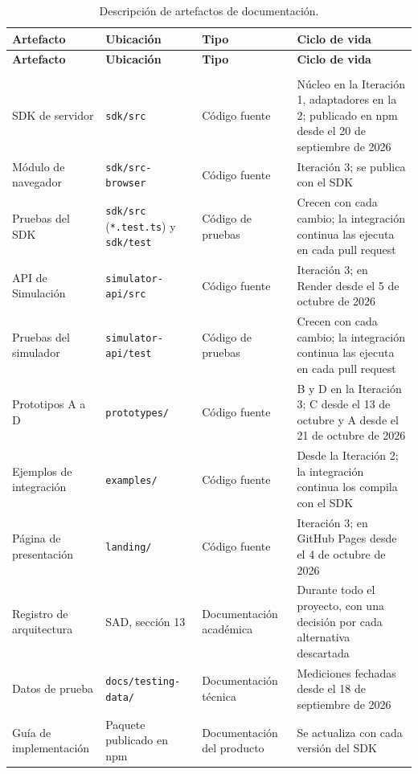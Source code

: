 \begin{center}
\renewcommand{\arraystretch}{1.2}
\begin{longtable}{|P{0.243}|P{0.241}|P{0.241}|P{0.241}|}
  \hline
  \textbf{Artefacto} & \textbf{Ubicación} & \textbf{Tipo} & \textbf{Ciclo de vida} \\
  \hline
  \endfirsthead
  \hline
  \textbf{Artefacto} & \textbf{Ubicación} & \textbf{Tipo} & \textbf{Ciclo de vida} \\
  \hline
  \endhead
  \caption{Descripción de artefactos de documentación.}
  \label{tab:artefactos-documentacion}\\
  \endlastfoot
  SDK de servidor & \texttt{sdk/src} & Código fuente & Núcleo en la Iteración 1, adaptadores en la 2; publicado en npm desde el 20 de septiembre de 2026 \\
  \hline
  Módulo de navegador & \texttt{sdk/src-browser} & Código fuente & Iteración 3; se publica con el SDK \\
  \hline
  Pruebas del SDK & \texttt{sdk/src} (\texttt{*.test.ts}) y \texttt{sdk/test} & Código de pruebas & Crecen con cada cambio; la integración continua las ejecuta en cada pull request \\
  \hline
  API de Simulación & \texttt{simulator-api/src} & Código fuente & Iteración 3; en Render desde el 5 de octubre de 2026 \\
  \hline
  Pruebas del simulador & \texttt{simulator-api/test} & Código de pruebas & Crecen con cada cambio; la integración continua las ejecuta en cada pull request \\
  \hline
  Prototipos A a D & \texttt{prototypes/} & Código fuente & B y D en la Iteración 3; C desde el 13 de octubre y A desde el 21 de octubre de 2026 \\
  \hline
  Ejemplos de integración & \texttt{examples/} & Código fuente & Desde la Iteración 2; la integración continua los compila con el SDK \\
  \hline
  Página de presentación & \texttt{landing/} & Código fuente & Iteración 3; en GitHub Pages desde el 4 de octubre de 2026 \\
  \hline
  Registro de arquitectura & SAD, sección 13 & Documentación académica & Durante todo el proyecto, con una decisión por cada alternativa descartada \\
  \hline
  Datos de prueba & \texttt{docs/testing-data/} & Documentación técnica & Mediciones fechadas desde el 18 de septiembre de 2026 \\
  \hline
  Guía de implementación & Paquete publicado en npm & Documentación del producto & Se actualiza con cada versión del SDK \\

\end{longtable}
\end{center}
